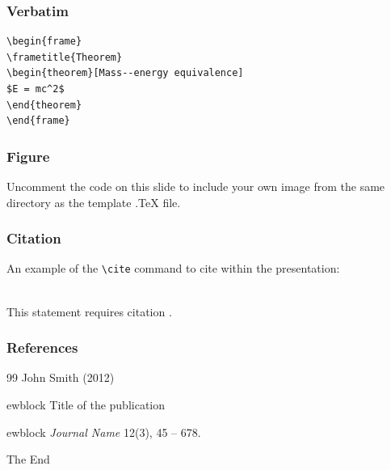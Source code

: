 \documentclass{beamer}
\begin{document}

\begin{frame}[fragile] %
\frametitle{Verbatim}
\begin{example}
\begin{verbatim}
\begin{frame}
\frametitle{Theorem}
\begin{theorem}[Mass--energy equivalence]
$E = mc^2$
\end{theorem}
\end{frame}\end{verbatim}
\end{example}
\end{frame}


\begin{frame}
\frametitle{Figure}
Uncomment the code on this slide to include your own image from the same directory as the template .TeX file.
\end{frame}


\begin{frame}[fragile] %
\frametitle{Citation}
An example of the \verb|\cite| command to cite within the presentation:\\~

This statement requires citation \cite{p1}.
\end{frame}


\begin{frame}
\frametitle{References}
\footnotesize{
\begin{thebibliography}{99} %
 John Smith (2012)

ewblock Title of the publication

ewblock \emph{Journal Name} 12(3), 45 -- 678.
\end{thebibliography}
}
\end{frame}


\begin{frame}
\Huge{\centerline{The End}}
\end{frame}

\end{document}
